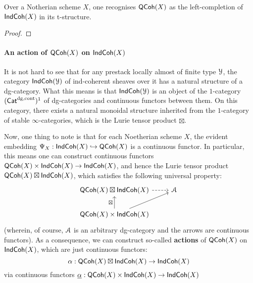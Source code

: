                    \begin{proposition} \label{prop: qcoh_is_the_left_completion_of_indcoh}
                        Over a Notherian scheme $X$, one recognises $\mathsf{QCoh}(X)$ as the left-completion of $\mathsf{Ind}\mathsf{Coh}(X)$ in its t-structure.
                    \end{proposition}
                        \begin{proof}
                            
                        \end{proof}
                    
                \paragraph{An action of \texorpdfstring{$\mathsf{QCoh}(X)$}{} on \texorpdfstring{$\mathsf{Ind}\mathsf{Coh}(X)$}{}}
                    It is not hard to see that for any prestack locally almost of finite type $\mathcal{Y}$, the category $\mathsf{Ind}\mathsf{Coh}(\mathcal{Y})$ of ind-coherent sheaves over it has a natural structure of a dg-category. What this means is that $\mathsf{Ind}\mathsf{Coh}(\mathcal{Y})$ is an object of the $1$-category $(\mathsf{Cat}^{\mathrm{dg}, \mathrm{cont}})^1$ of dg-categories and continuous functors between them. On this category, there exists a natural monoidal structure inherited from the $1$-category of stable $\infty$-categories, which is the Lurie tensor product $\boxtimes$. 
                
                    Now, one thing to note is that for each Noetherian scheme $X$, the evident embedding $\Psi_X: \mathsf{Ind}\mathsf{Coh}(X) \hookrightarrow \mathsf{QCoh}(X)$ is a continuous functor. In particular, this means one can construct continuous functors $\QCoh(X) \x \Ind\Coh(X) \to \Ind\Coh(X)$, and hence the Lurie tensor product $\mathsf{QCoh}(X) \boxtimes \mathsf{Ind}\mathsf{Coh}(X)$, which satisfies the following universal property:
                        $$
                            \begin{tikzcd}
                            	{\QCoh(X) \boxtimes \Ind\Coh(X)} & \calA \\
                            	{\QCoh(X) \x \Ind\Coh(X)}
                            	\arrow[from=2-1, to=1-2]
                            	\arrow[dashed, from=1-1, to=1-2]
                            	\arrow["\boxtimes", from=2-1, to=1-1]
                            \end{tikzcd}
                        $$
                    (wherein, of course, $\mathcal{A}$ is an arbitrary dg-category and the arrows are continuous functors). As a consequence, we can construct so-called \textbf{actions} of $\mathsf{QCoh}(X)$ on $\mathsf{Ind}\mathsf{Coh}(X)$, which are just continuous functors:
                        $$\alpha: \mathsf{QCoh}(X) \boxtimes \mathsf{Ind}\mathsf{Coh}(X) \to \mathsf{Ind}\mathsf{Coh}(X)$$
                    via continuous functors $\underline{\alpha}: \QCoh(X) \x \Ind\Coh(X) \to \Ind\Coh(X)$
                        
